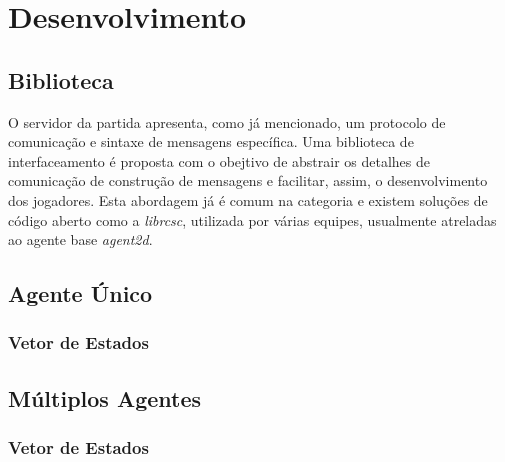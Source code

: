 \chapter{Desenvolvimento \label{chap:Desenvolvimento}}



\section{Biblioteca}
\par O servidor da partida apresenta, como já mencionado, um protocolo de comunicação e sintaxe de mensagens específica. Uma biblioteca de interfaceamento é proposta com o obejtivo de abstrair os detalhes de comunicação de construção de mensagens e facilitar, assim, o desenvolvimento dos jogadores. Esta abordagem já é comum na categoria e existem soluções de código aberto como a \textit{librcsc}, utilizada por várias equipes, usualmente atreladas ao agente base \textit{agent2d}.

\section{Agente Único}

\subsection{Vetor de Estados}

\section{Múltiplos Agentes}

\subsection{Vetor de Estados}


